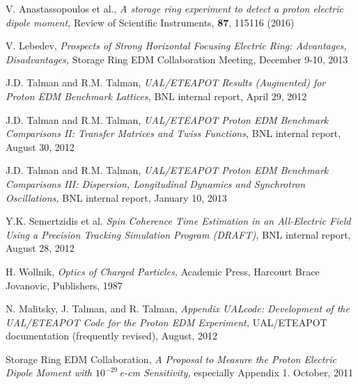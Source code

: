 \documentclass[12]{article}
\begin{document}
\clearpage

\begin{thebibliography}{99}

V. Anastassopoulos et al., \emph{A storage ring experiment to detect a proton 
electric dipole moment,} Review of Scientific Instruments, 
{\bf 87}, 115116 (2016)

V. Lebedev, \emph{Prospects of Strong Horizontal Focusing Electric Ring:
Advantages, Disadvantages,} Storage Ring EDM
Collaboration Meeting, December 9-10, 2013 

J.D. Talman and R.M. Talman, \emph{ UAL/ETEAPOT Results 
(Augmented) for Proton EDM Benchmark Lattices,} BNL internal
report, April 29, 2012

J.D. Talman and R.M. Talman, \emph{ UAL/ETEAPOT Proton EDM 
Benchmark Comparisons II: Transfer Matrices and Twiss Functions,} 
BNL internal report, August 30, 2012

J.D. Talman and R.M. Talman, \emph{ UAL/ETEAPOT Proton EDM Benchmark 
Comparisons III: Dispersion, Longitudinal Dynamics and Synchrotron 
Oscillations,} BNL internal report, January 10, 2013

Y.K. Semertzidis et al. \emph{Spin Coherence Time Estimation in an All-Electric Field 
Using a Precision Tracking Simulation Program (DRAFT),}  
BNL internal report, August 28, 2012

H. Wollnik, \emph{Optics of Charged Particles,} Academic Press, Harcourt
Brace Jovanovic, Publishers, 1987

N. Malitsky, J. Talman, and R. Talman, \emph{Appendix UALcode: Development of the
UAL/ETEAPOT Code for the Proton EDM Experiment,} UAL/ETEAPOT documentation
(frequently revised), August, 2012

Storage Ring EDM Collaboration, \emph{A Proposal to Measure the
Proton Electric Dipole Moment with $10^{-29}\,$e-cm Sensitivity,}
especially Appendix 1. October, 2011

\end{thebibliography}
\end{document}
